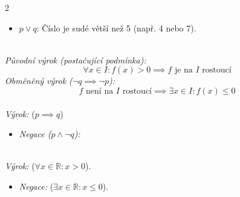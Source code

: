 \documentclass[main.tex]{subfiles}
\begin{document}
\begin{multicols}{2}
{\begin{itemize}[leftmargin=1.5em]
    \item $p \lor q$: Číslo je sudé  větší než 5 (např. 4 nebo 7).
\end{itemize}
\vspace{1em}
\\
\textit{Původní výrok (postačující podmínka):}
$$\forall x \in I \colon f(x) > 0 \implies f \text{ je na } I \text{ rostoucí}$$
\textit{Obměněný výrok ($\neg q \implies \neg p$):}
$$f \text{ není na } I \text{ rostoucí} \implies \exists x \in I \colon f(x) \leq 0$$
\vspace{1em}
\\
\textit{Výrok:}  ($p \implies q$)
\begin{itemize}[leftmargin=1.5em]
    \item \textit{Negace ($p \land \neg q$):} 
\end{itemize}
\vspace{1em}
\\
\textit{Výrok:}  ($\forall x \in \mathbb{R} \colon x > 0$).
\begin{itemize}[leftmargin=1.5em]
    \item \textit{Negace:}  ($\exists x \in \mathbb{R} \colon x \leq 0$).
\end{itemize}
}
\end{multicols}
\wpage
\end{document}
